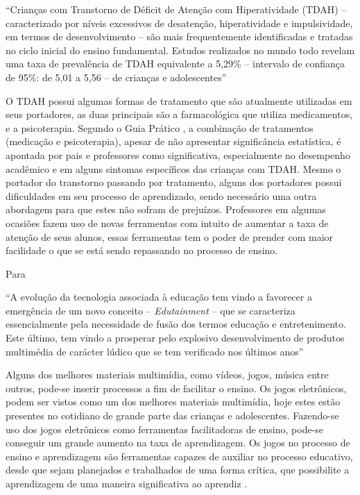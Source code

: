 \documentclass[
	12pt,				%
    oneside,			%
	a4paper,			%
	english,			%
	french,				%
	spanish,			%
	brazil,				%
	]{abntex2}
\begin{document}
	\begin{citacao} 
		“Crianças com Transtorno de Déficit de Atenção com Hiperatividade (TDAH) – caracterizado por níveis excessivos de desatenção, hiperatividade e impulsividade, em termos de desenvolvimento – são mais frequentemente identificadas e tratadas no ciclo inicial do ensino fundamental. Estudos realizados no mundo todo revelam uma taxa de prevalência de TDAH equivalente a 5,29\% – intervalo de confiança de 95\%: de 5,01 a 5,56 – de crianças e adolescentes”\cite{charach}
	\end{citacao}

	O TDAH possui algumas formas de tratamento que são atualmente utilizadas em seus portadores, as duas principais são a farmacológica que utiliza medicamentos, e a psicoterapia. Segundo o Guia Prático , a combinação de tratamentos (medicação e psicoterapia), apesar de não apresentar significância estatística, é apontada por pais e professores como significativa, especialmente no desempenho acadêmico e em alguns sintomas específicos das crianças com TDAH. Mesmo o portador do transtorno passando por tratamento, alguns dos portadores possui dificuldades em seu processo de aprendizado, sendo necessário uma outra abordagem para que estes não sofram de prejuízos. Professores em algumas ocasiões fazem uso de novas ferramentas com intuito de aumentar a taxa de atenção de seus alunos, essas ferramentas tem o poder de prender com maior facilidade o que se está sendo repassando no processo de ensino.
		
	Para 
	
	\begin{citacao}	
		“A evolução da tecnologia associada à educação tem vindo a favorecer a emergência de um novo conceito – \textit{Edutainment} – que se caracteriza essencialmente pela necessidade de fusão dos termos educação e entretenimento. Este último, tem vindo a prosperar pelo explosivo desenvolvimento de produtos multimédia de carácter lúdico que se tem verificado nos últimos anos”
	\end{citacao}
	
	Alguns dos melhores materiais multimídia, como vídeos, jogos, música entre outros, pode-se inserir processos a fim de facilitar o ensino. Os jogos eletrônicos, podem ser vistos como um dos melhores materiais multimídia, hoje estes estão presentes no cotidiano de grande parte das crianças e adolescentes. Fazendo-se uso dos jogos eletrônicos como ferramentas facilitadoras de ensino, pode-se conseguir um grande aumento na taxa de aprendizagem. Os jogos no processo de ensino e aprendizagem são ferramentas capazes de auxiliar no processo educativo, desde que sejam planejados e trabalhados de uma forma crítica, que possibilite a aprendizagem de uma maneira significativa ao aprendiz \cite{pietruchinski}.
\end{document}
